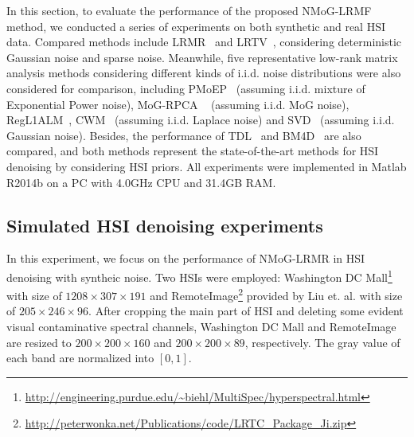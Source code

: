 \documentclass[journal]{IEEEtran}
\begin{document}
In this section, to evaluate the performance of the proposed NMoG-LRMF method, we conducted a series of experiments on both synthetic and real HSI data. Compared methods include  LRMR~\cite{zhang2014hyperspectral} and LRTV~\cite{hetotal}, considering  deterministic Gaussian noise and sparse noise.  Meanwhile, five representative low-rank matrix analysis methods considering different kinds of i.i.d. noise distributions were also considered for comparison, including  PMoEP~\cite{cao2015PMoEP} (assuming i.i.d. mixture of Exponential Power noise), MoG-RPCA ~\cite{zhao2014robust} (assuming i.i.d. MoG noise), RegL1ALM~\cite{zheng2012practical}, CWM~\cite{meng2013cyclic} (assuming i.i.d. Laplace noise) and SVD~\cite{haardt1996method} (assuming i.i.d. Gaussian noise).  Besides, the performance of TDL~\cite{peng2014decomposable} and BM4D~\cite{BM4D2013TIP} are also compared, and both methods represent the state-of-the-art methods for HSI denoising by considering HSI priors. All experiments were implemented in Matlab R2014b on a PC with 4.0GHz CPU and 31.4GB RAM.

\subsection{Simulated HSI denoising experiments}

In this experiment, we focus on the performance of NMoG-LRMR in HSI denoising  with syntheic noise. Two HSIs were employed: Washington DC Mall\footnote{\url{http://engineering.purdue.edu/~biehl/MultiSpec/hyperspectral.html}} with size of $ 1208 \times 307 \times 191$ and RemoteImage\footnote{\url{http://peterwonka.net/Publications/code/LRTC\_Package\_Ji.zip}} provided by Liu et. al. \cite{liu2013tensor} with size of $ 205 \times 246 \times 96 $.  After cropping the main part of HSI and deleting some evident visual contaminative spectral channels, Washington DC Mall and RemoteImage are  resized to $ 200 \times 200 \times 160 $ and $ 200 \times 200 \times 89 $, respectively. The gray value of each band are normalized into $ [0,1] $.
\end{document}

